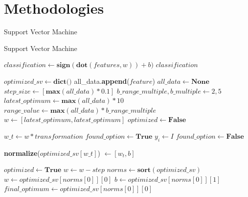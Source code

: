 \documentclass[12pt,a4paper,final]{report}
\begin{document}
\section{Methodologies}
\begin{algorithm}
\caption{Support Vector Machine}
\begin{algorithmic}[1]
\State
\end{algorithmic}
\end{algorithm}

\begin{algorithm}
\caption{Support Vector Machine}
\begin{algorithmic}[1]

\State $classification \leftarrow \textbf{sign}(\textbf{dot}(features,w)) + b)$
\State \Return $classification$
\EndFunction

\State $optimized\_sv \leftarrow \textbf{dict()}$
			\State all\_data.\textbf{append}($feature$)
		\EndFor
	\EndFor
\EndFor
\State $all\_data \leftarrow \textbf{None}$
\State $step\_size \leftarrow [\textbf{max}(all\_data)*0.1]$
\State $b\_range\_multiple, b\_multiple \leftarrow 2, 5$
\State $latest\_optimum \leftarrow \textbf{max}(all\_data) * 10$ 
\State $range\_value \leftarrow \textbf{max}(all\_data) * b\_range\_multiple$
	\State $w \leftarrow [latest\_optimum,latest\_optimum]$ 
	\State $optimized \leftarrow \textbf{False}$
	
				\State $w\_t \leftarrow w * transformation		$	
				\State $found\_option \leftarrow \textbf{True}$
						\State $y_i \leftarrow I$ 		
						\State $found\_option \leftarrow \textbf{False}$
						\EndIf
									
					\EndFor
				\EndFor			
					\State \textbf{normalize}($optimized\_sv[w\_t]$) $\leftarrow [w_t, b]$ 			 	
				\EndIf			
			\EndFor		
	
	\EndFor
		\State $optimized \leftarrow \textbf{True}$	
	\Else
		\State $w \leftarrow w - step$
	\EndIf
	\EndWhile
	\State $norms \leftarrow \textbf{sort}(optimized\_sv)$
	\State $w \leftarrow optimized\_sv[norms[0]][0]$
	\State $b \leftarrow optimized\_sv[norms[0]][1]$
	\State $final\_optimum \leftarrow optimized\_sv[norms[0]][0]$
\EndFor
	
\EndFunction
\end{algorithmic}
\end{algorithm}
\end{document}
